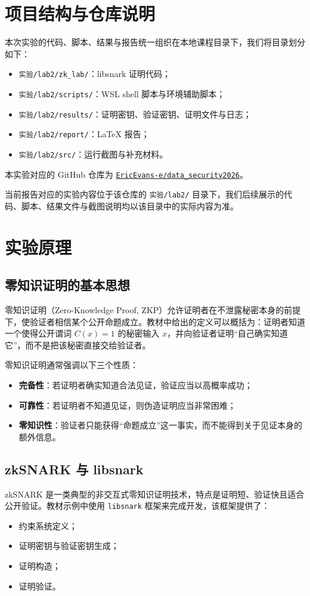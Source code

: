\documentclass[UTF8,a4paper,10pt]{ctexart}
\begin{document}
\section{项目结构与仓库说明}
本次实验的代码、脚本、结果与报告统一组织在本地课程目录下，我们将目录划分如下：
\begin{itemize}
    \item \texttt{实验/lab2/zk\_lab/}：libsnark 证明代码；
    \item \texttt{实验/lab2/scripts/}：WSL shell 脚本与环境辅助脚本；
    \item \texttt{实验/lab2/results/}：证明密钥、验证密钥、证明文件与日志；
    \item \texttt{实验/lab2/report/}：LaTeX 报告；
    \item \texttt{实验/lab2/src/}：运行截图与补充材料。
\end{itemize}

本实验对应的 GitHub 仓库为 \href{https://github.com/EricEvans-e/data_security2026}{\texttt{EricEvans-e/data\_security2026}}。

当前报告对应的实验内容位于该仓库的 \texttt{实验/lab2/} 目录下，我们后续展示的代码、脚本、结果文件与截图说明均以该目录中的实际内容为准。

\section{实验原理}

\subsection{零知识证明的基本思想}
零知识证明（Zero-Knowledge Proof, ZKP）允许证明者在不泄露秘密本身的前提下，使验证者相信某个公开命题成立。教材中给出的定义可以概括为：证明者知道一个使得公开谓词 $C(x)=1$ 的秘密输入 $x$，并向验证者证明“自己确实知道它”，而不是把该秘密直接交给验证者。

零知识证明通常强调以下三个性质：
\begin{itemize}
    \item \textbf{完备性}：若证明者确实知道合法见证，验证应当以高概率成功；
    \item \textbf{可靠性}：若证明者不知道见证，则伪造证明应当非常困难；
    \item \textbf{零知识性}：验证者只能获得“命题成立”这一事实，而不能得到关于见证本身的额外信息。
\end{itemize}

\subsection{zkSNARK 与 libsnark}
zkSNARK 是一类典型的非交互式零知识证明技术，特点是证明短、验证快且适合公开验证。教材示例中使用 \texttt{libsnark} 框架来完成开发，该框架提供了：
\begin{itemize}
    \item 约束系统定义；
    \item 证明密钥与验证密钥生成；
    \item 证明构造；
    \item 证明验证。
\end{itemize}
\end{document}
